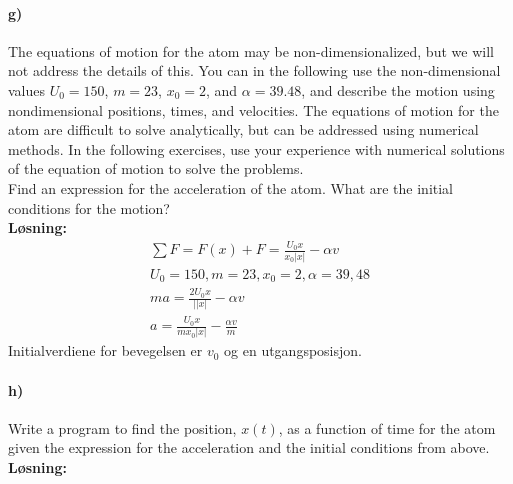 \documentclass[11pt, A4paper,norsk]{article}
\begin{document}
		\paragraph{g)}
			\begin{flushleft}
The equations of motion for the atom may be non-dimensionalized, but we will not address the details of this. You can in the following use the non-dimensional values $U_0 = 150$, $m = 23$, $x_0 = 2$, and $\alpha = 39.48$, and describe the motion using nondimensional positions, times, and velocities. The equations of motion for the atom are difficult to solve analytically, but can be addressed using numerical methods. In the following exercises, use your experience with numerical solutions of the equation of motion to solve the problems. \\
Find an expression for the acceleration of the atom. What are the initial conditions for the motion? \\
\vspace{1mm}
\textbf{Løsning:} \\
\vspace{1mm}
				\begin{align}
\sum F = F(x) + F = \frac{U_0 x}{x_0 |x|} - \alpha v \nonumber \\
U_0 = 150 , m = 23 , x_0 = 2 , \alpha = 39,48 \nonumber \\
ma = \frac{2U_0 x}{||x|} - \alpha v \nonumber \\
a = \frac{U_0 x}{mx_0 |x|} - \frac{\alpha v}{m} \nonumber
				\end{align}
Initialverdiene for bevegelsen er $v_0$ og en utgangsposisjon.
			\end{flushleft}









		\paragraph{h)}
			\begin{flushleft}
Write a program to find the position, $x(t)$, as a function of time for the atom given the expression for the acceleration and the initial conditions from above. \\
\vspace{1mm}
\textbf{Løsning:} \\
\vspace{1mm}

				\end{flushleft}
\end{document}
